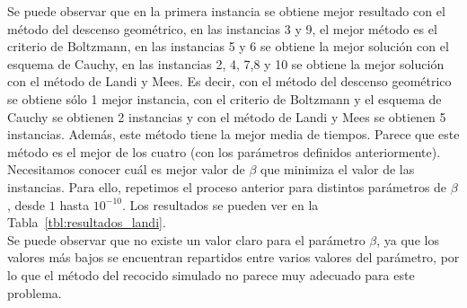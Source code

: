\documentclass[12pt,a4paper,twoside,openright,titlepage,final]{article}
\begin{document}
Se puede observar que en la primera instancia se obtiene mejor resultado con el método del descenso geométrico, en las instancias 3 y 9, el mejor método es el criterio de Boltzmann, en las instancias 5 y 6 se obtiene la mejor solución con el esquema de Cauchy, en las instancias 2, 4, 7,8 y 10 se obtiene la mejor solución con el método de Landi y Mees. Es decir, con el método del descenso geométrico se obtiene sólo 1 mejor instancia, con el criterio de Boltzmann y el esquema de Cauchy se obtienen 2 instancias y con el método de Landi y Mees se obtienen 5 instancias. Además, este método tiene la mejor media de tiempos. Parece que este método es el mejor de los cuatro (con los parámetros definidos anteriormente).\\

Necesitamos conocer cuál es mejor valor de $\beta$ que minimiza el valor de las instancias. Para ello, repetimos el proceso anterior para distintos parámetros de $\beta$, desde $1$ hasta $10^{-10}$. Los resultados se pueden ver en la Tabla~\ref{tbl:resultados_landi}.\\

Se puede observar que no existe un valor claro para el parámetro $\beta$, ya que los valores más bajos se encuentran repartidos entre varios valores del parámetro, por lo que el método del recocido simulado no parece muy adecuado para este problema.\\
\end{document}
